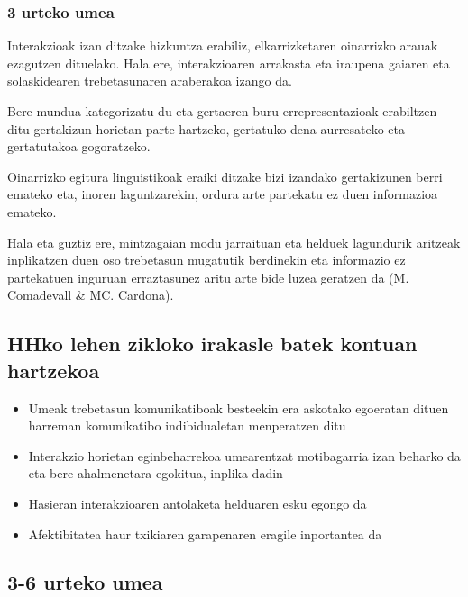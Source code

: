 \documentclass[
]{book}
\providecommand{\tightlist}{%
  \setlength{\itemsep}{0pt}\setlength{\parskip}{0pt}}
\begin{document}
\hypertarget{urteko-umea}{%
\subsubsection{3 urteko umea}\label{urteko-umea}}

\begin{description}
\tightlist
\item[Sozialki]
Interakzioak izan ditzake hizkuntza erabiliz, elkarrizketaren oinarrizko arauak ezagutzen dituelako. Hala ere, interakzioaren arrakasta eta iraupena gaiaren eta solaskidearen trebetasunaren araberakoa izango da.
\item[Kognitiboki]
Bere mundua kategorizatu du eta gertaeren buru-errepresentazioak erabiltzen ditu gertakizun horietan parte hartzeko, gertatuko dena aurresateko eta gertatutakoa gogoratzeko.
\item[Linguistikoki]
Oinarrizko egitura linguistikoak eraiki ditzake bizi izandako gertakizunen berri emateko eta, inoren laguntzarekin, ordura arte partekatu ez duen informazioa emateko.
\end{description}

Hala eta guztiz ere, mintzagaian modu jarraituan eta helduek lagundurik aritzeak inplikatzen duen oso trebetasun mugatutik berdinekin eta informazio ez partekatuen inguruan erraztasunez aritu arte bide luzea geratzen da (M. Comadevall \& MC. Cardona).

\hypertarget{hhko-lehen-zikloko-irakasle-batek-kontuan-hartzekoa}{%
\subsection{HHko lehen zikloko irakasle batek kontuan hartzekoa}\label{hhko-lehen-zikloko-irakasle-batek-kontuan-hartzekoa}}

\begin{itemize}
\tightlist
\item
  Umeak trebetasun komunikatiboak besteekin era askotako egoeratan dituen harreman komunikatibo indibidualetan menperatzen ditu
\item
  Interakzio horietan eginbeharrekoa umearentzat motibagarria izan beharko da eta bere ahalmenetara egokitua, inplika dadin
\item
  Hasieran interakzioaren antolaketa helduaren esku egongo da
\item
  Afektibitatea haur txikiaren garapenaren eragile inportantea da
\end{itemize}

\hypertarget{urteko-umea-1}{%
\subsection{3-6 urteko umea}\label{urteko-umea-1}}
\end{document}
